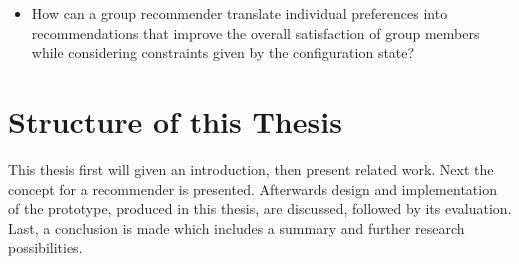 \begin{itemize}
    \item How can a group recommender translate individual preferences into recommendations that improve the overall satisfaction of group members while considering constraints given by the configuration state? 
\end{itemize}


\section{Structure of this Thesis}
\label{sec:Introduction:Structure}

This thesis first will given an introduction, then present related work. Next the concept for a recommender is presented. Afterwards design and implementation of the prototype, produced in this thesis, are discussed, followed by its evaluation. Last, a conclusion is made which includes a summary and further research possibilities.
